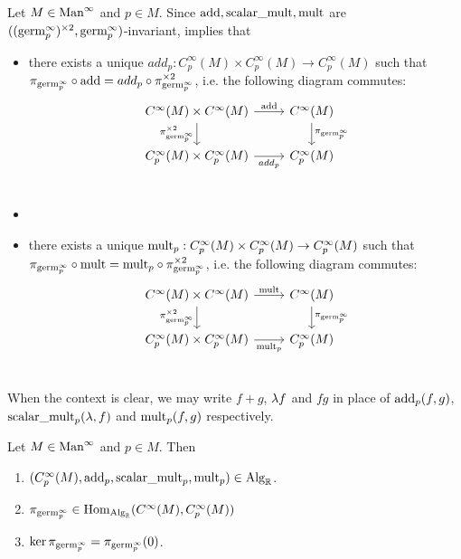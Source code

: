 \documentclass{book}
\begin{document}
\begin{defn}
	Let $M \in \text{Man}^{\infty}$ and $p \in M$. Since $\text{add}, \text{scalar\textunderscore mult}, \text{mult}$ are $((\text{germ}^{\infty}_p)^{\times 2}, \text{germ}^{\infty}_p)$-invariant,  implies that
	\begin{itemize}
		\item there exists a unique $add_p: C_p^{\infty}(M) \times C_p^{\infty}(M) \rightarrow C_p^{\infty}(M)$ such that $\pi_{\text{germ}^{\infty}_p} \circ \text{add} = add_p \circ \pi^{\times 2}_{\text{germ}^{\infty}_p}$, i.e. the following diagram commutes:
		\[ 
		\begin{tikzcd}
			C^{\infty}(M) \times C^{\infty}(M)  \arrow[r, "\add"]  \arrow[d, "\pi^{\times 2}_{\germinf_p}"'] & C^{\infty}(M)   \arrow[d, "\pi_{\germinf_p}"]\\
			C_p^{\infty}(M) \times C_p^{\infty}(M) \arrow[r, "add_p"'] &  C_p^{\infty}(M) \\
		\end{tikzcd}
		\]
		\item {}
		\item there exists a unique $\text{mult}_p: C_p^{\infty}(M) \times C_p^{\infty}(M) \rightarrow C_p^{\infty}(M)$ such that $\pi_{\text{germ}^{\infty}_p} \circ \text{mult} = \text{mult}_p \circ\pi^{\times 2}_{\text{germ}^{\infty}_p}$, i.e. the following diagram commutes:
		\[ 
		\begin{tikzcd}
			C^{\infty}(M) \times C^{\infty}(M)  \arrow[r, "\mult"]  \arrow[d, "\pi^{\times 2}_{\germinf_p}"'] & C^{\infty}(M)   \arrow[d, "\pi_{\germinf_p}"]\\
			C_p^{\infty}(M) \times C_p^{\infty}(M) \arrow[r, "\mult_p"'] &  C_p^{\infty}(M) \\
		\end{tikzcd}
		\]
	\end{itemize}
\end{defn}

\begin{note}
	When the context is clear, we may write $f + g$, $\lambda f$ and $fg$ in place of $\text{add}_p(f,g)$, $\text{scalar\textunderscore mult}_p(\lambda, f)$ and $\text{mult}_p(f,g)$ respectively.
\end{note}

\begin{ex}
	Let $M \in \text{Man}^{\infty}$ and $p \in M$. Then 
	\begin{enumerate}
		\item $(C_p^{\infty}(M), \text{add}_p, \text{scalar\textunderscore mult}_p, \text{mult}_p) \in \text{Alg}_{\mathbb{R}}$. 
		\item $\pi_{\text{germ}^{\infty}_p} \in \operatorname{Hom}_{\text{Alg}_{\mathbb{R}}}(C^{\infty}(M), C_p^{\infty}(M))$
		\item $\ker \pi_{\text{germ}^{\infty}_p} = \pi_{\text{germ}^{\infty}_p}(0)$.
	\end{enumerate}
\end{ex}
\end{document}
